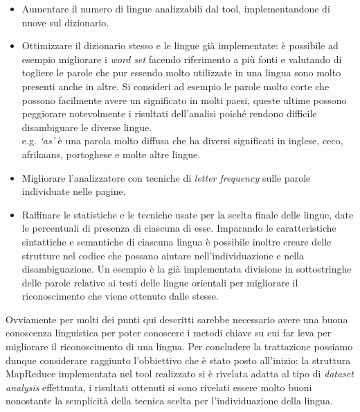 \documentclass{article}
\newcommand{\MR}{MapReduce}
\begin{document}
\begin{itemize}
    \item Aumentare il numero di lingue analizzabili dal tool, implementandone di nuove sul dizionario.
    \item Ottimizzare il dizionario stesso e le lingue già implementate: è possibile ad esempio migliorare i \textit{word set} facendo riferimento a più fonti e valutando di togliere le parole che pur essendo molto utilizzate in una lingua sono molto presenti anche in altre. Si consideri ad esempio le parole molto corte che possono facilmente avere un significato in molti paesi, queste ultime possono peggiorare notevolmente i risultati dell'analisi poiché rendono difficile disambiguare le diverse lingue.\\
    e.g. \textit{`as'} è una parola molto diffusa che ha diversi significati in inglese, ceco, afrikaans, portoghese e molte altre lingue.
    \item Migliorare l'analizzatore con tecniche di \textit{letter frequency} sulle parole individuate nelle pagine.
    \item Raffinare le statistiche e le tecniche usate per la scelta finale delle lingue, date le percentuali di presenza di ciascuna di esse. Imparando le caratteristiche sintattiche e semantiche di ciascuna lingua è possibile inoltre creare delle strutture nel codice che possano aiutare nell'individuazione e nella disambiguazione. Un esempio è la già implementata divisione in sottostringhe delle parole relative ai testi delle lingue orientali per migliorare il riconoscimento che viene ottenuto dalle stesse.
\end{itemize}
Ovviamente per molti dei punti qui descritti sarebbe necessario avere una buona conoscenza linguistica per poter conoscere i metodi chiave su cui far leva per migliorare il riconoscimento di una lingua. Per concludere la trattazione possiamo dunque considerare raggiunto l'obbiettivo che è stato posto all'inizio: la struttura \MR{} implementata nel tool realizzato si è rivelata adatta al tipo di \textit{dataset analysis} effettuata, i risultati ottenuti si sono rivelati essere molto buoni nonostante la semplicità della tecnica scelta per l'individuazione della lingua.   

\newpage




\nocite{crawler}
\nocite{iso639}
\end{document}
